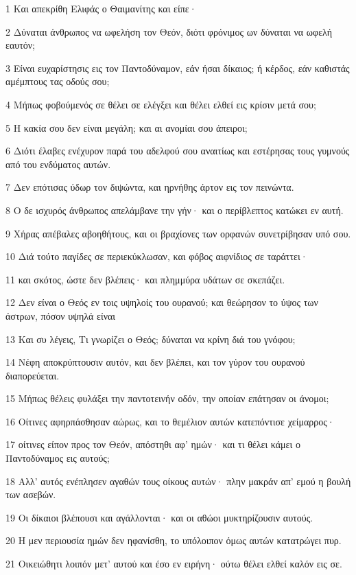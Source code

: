 \par 1 Και απεκρίθη Ελιφάς ο Θαιμανίτης και είπε·
\par 2 Δύναται άνθρωπος να ωφελήση τον Θεόν, διότι φρόνιμος ων δύναται να ωφελή εαυτόν;
\par 3 Είναι ευχαρίστησις εις τον Παντοδύναμον, εάν ήσαι δίκαιος; ή κέρδος, εάν καθιστάς αμέμπτους τας οδούς σου;
\par 4 Μήπως φοβούμενός σε θέλει σε ελέγξει και θέλει ελθεί εις κρίσιν μετά σου;
\par 5 Η κακία σου δεν είναι μεγάλη; και αι ανομίαι σου άπειροι;
\par 6 Διότι έλαβες ενέχυρον παρά του αδελφού σου αναιτίως και εστέρησας τους γυμνούς από του ενδύματος αυτών.
\par 7 Δεν επότισας ύδωρ τον διψώντα, και ηρνήθης άρτον εις τον πεινώντα.
\par 8 Ο δε ισχυρός άνθρωπος απελάμβανε την γήν· και ο περίβλεπτος κατώκει εν αυτή.
\par 9 Χήρας απέβαλες αβοηθήτους, και οι βραχίονες των ορφανών συνετρίβησαν υπό σου.
\par 10 Διά τούτο παγίδες σε περιεκύκλωσαν, και φόβος αιφνίδιος σε ταράττει·
\par 11 και σκότος, ώστε δεν βλέπεις· και πλημμύρα υδάτων σε σκεπάζει.
\par 12 Δεν είναι ο Θεός εν τοις υψηλοίς του ουρανού; και θεώρησον το ύψος των άστρων, πόσον υψηλά είναι
\par 13 Και συ λέγεις, Τι γνωρίζει ο Θεός; δύναται να κρίνη διά του γνόφου;
\par 14 Νέφη αποκρύπτουσιν αυτόν, και δεν βλέπει, και τον γύρον του ουρανού διαπορεύεται.
\par 15 Μήπως θέλεις φυλάξει την παντοτεινήν οδόν, την οποίαν επάτησαν οι άνομοι;
\par 16 Οίτινες αφηρπάσθησαν αώρως, και το θεμέλιον αυτών κατεπόντισε χείμαρρος·
\par 17 οίτινες είπον προς τον Θεόν, απόστηθι αφ' ημών· και τι θέλει κάμει ο Παντοδύναμος εις αυτούς;
\par 18 Αλλ' αυτός ενέπλησεν αγαθών τους οίκους αυτών· πλην μακράν απ' εμού η βουλή των ασεβών.
\par 19 Οι δίκαιοι βλέπουσι και αγάλλονται· και οι αθώοι μυκτηρίζουσιν αυτούς.
\par 20 Η μεν περιουσία ημών δεν ηφανίσθη, το υπόλοιπον όμως αυτών κατατρώγει πυρ.
\par 21 Οικειώθητι λοιπόν μετ' αυτού και έσο εν ειρήνη· ούτω θέλει ελθεί καλόν εις σε.

